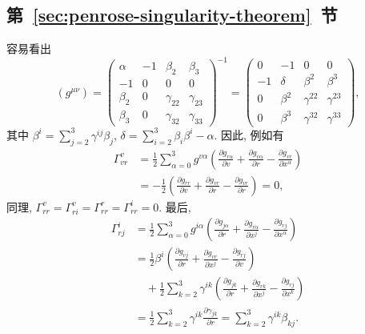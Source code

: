 \subsection{\texorpdfstring{第~\ref{sec:penrose-singularity-theorem}~节}{Penrose 奇性定理}}\label{subsec:solutions-penrose-singularity-theorem}

\begin{description}[font=\normalfont,leftmargin=2em,labelwidth=1.5em]
容易看出
\[
  (g^{\mu\nu})=
  \begin{pmatrix}
    \alpha&-1&\beta_2&\beta_3\\
    -1&0&0&0\\
    \beta_2&0&\gamma_{22}&\gamma_{23}\\
    \beta_3&0&\gamma_{32}&\gamma_{33}
  \end{pmatrix}^{-1}
  =
  \begin{pmatrix}
    0&-1&0&0\\
    -1&\delta&\beta^2&\beta^3\\
    0&\beta^2&\gamma^{22}&\gamma^{23}\\
    0&\beta^3&\gamma^{32}&\gamma^{33}
  \end{pmatrix},
\]
其中 $\beta^i=\sum_{j=2}^3\gamma^{ij}\beta_j$, $\delta=\sum_{i=2}^3\beta_i\beta^i-\alpha$. 因此, 例如有
\begin{align*}
  \Gamma_{vr}^v
   &=\frac{1}{2}\sum_{\alpha=0}^3g^{v\alpha}
      \left(\frac{\partial g_{r\alpha}}{\partial v}
            +\frac{\partial g_{v\alpha}}{\partial r}
            -\frac{\partial g_{vr}}{\partial x^\alpha}\right)\\
   &=-\frac{1}{2}\left(\frac{\partial g_{rr}}{\partial v}
            +\frac{\partial g_{vr}}{\partial r}
            -\frac{\partial g_{vr}}{\partial r}\right)=0,
\end{align*}
同理, $\Gamma_{rr}^v=\Gamma_{ri}^v=\Gamma_{rr}^r=\Gamma_{rr}^i=0$. 最后,
\begin{align*}
  \Gamma_{rj}^i
   &=\frac{1}{2}\sum_{\alpha=0}^3g^{i\alpha}
       \left(\frac{\partial g_{j\alpha}}{\partial r}
             +\frac{\partial g_{r\alpha}}{\partial x^j}
             -\frac{\partial g_{rj}}{\partial x^\alpha}\right)\\
   &=\frac{1}{2}\beta^i
       \left(\frac{\partial g_{vj}}{\partial r}
             +\frac{\partial g_{vr}}{\partial x^j}
             -\frac{\partial g_{rj}}{\partial v}\right)\\
   &\quad+\frac{1}{2}\sum_{k=2}^3\gamma^{ik}
       \left(\frac{\partial g_{jk}}{\partial r}
             +\frac{\partial g_{rk}}{\partial x^j}
             -\frac{\partial g_{rj}}{\partial x^k}\right)\\
   &=\frac{1}{2}\sum_{k=2}^3\gamma^{ik}\frac{\partial\gamma_{jk}}{\partial r}
       =\sum_{k=2}^3\gamma^{ik}\beta_{kj}.
\end{align*}


\end{description}
